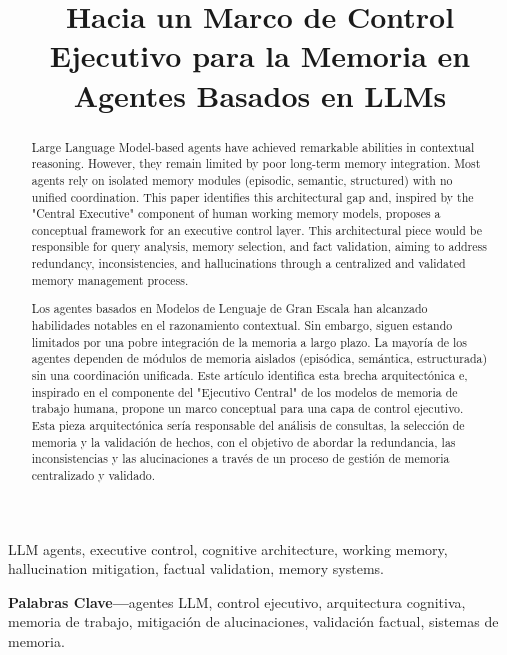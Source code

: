 \documentclass[conference]{IEEEtran}
\title{Hacia un Marco de Control Ejecutivo para la Memoria en Agentes Basados en LLMs}
\author{
    \IEEEauthorblockN{Sebastian Eduardo Francisco Puentes Prieto}
    \IEEEauthorblockA{
        Magíster en Ingeniería Informática\\
        Universidad de La Frontera\\
        Email: spuentes.01@ufromail.cl}
}
\begin{document}
\newpage
{} %
\tableofcontents
\newpage
{} %
\setcounter{page}{1} %


\maketitle

\begin{abstract}
Large Language Model-based agents have achieved remarkable abilities in contextual reasoning. However, they remain limited by poor long-term memory integration. Most agents rely on isolated memory modules (episodic, semantic, structured) with no unified coordination. This paper identifies this architectural gap and, inspired by the "Central Executive" component of human working memory models, proposes a conceptual framework for an executive control layer. This architectural piece would be responsible for query analysis, memory selection, and fact validation, aiming to address redundancy, inconsistencies, and hallucinations through a centralized and validated memory management process.
\end{abstract}

\begin{IEEEkeywords}
LLM agents, executive control, cognitive architecture, working memory, hallucination mitigation, factual validation, memory systems.
\end{IEEEkeywords}
\begin{abstract}

Los agentes basados en Modelos de Lenguaje de Gran Escala han alcanzado habilidades notables en el razonamiento contextual. Sin embargo, siguen estando limitados por una pobre integración de la memoria a largo plazo. La mayoría de los agentes dependen de módulos de memoria aislados (episódica, semántica, estructurada) sin una coordinación unificada. Este artículo identifica esta brecha arquitectónica e, inspirado en el componente del "Ejecutivo Central" de los modelos de memoria de trabajo humana, propone un marco conceptual para una capa de control ejecutivo. Esta pieza arquitectónica sería responsable del análisis de consultas, la selección de memoria y la validación de hechos, con el objetivo de abordar la redundancia, las inconsistencias y las alucinaciones a través de un proceso de gestión de memoria centralizado y validado.
\end{abstract}
\begin{IEEEkeywords}
\textbf{Palabras Clave---}agentes LLM, control ejecutivo, arquitectura cognitiva, memoria de trabajo, mitigación de alucinaciones, validación factual, sistemas de memoria.
\end{IEEEkeywords}
\end{document}
